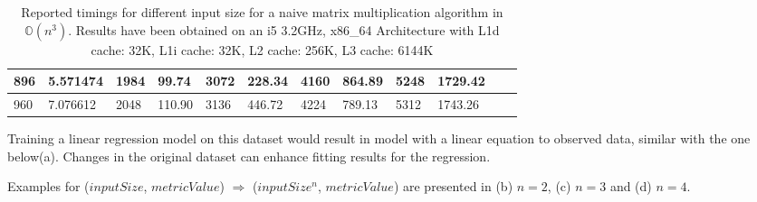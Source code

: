 \begin{table}[H]
\begin{center}
{\begin{tabular}{|l|l|l|l|l|l|l|l|l|l|l|l|}
896                                                  & 5.571474 & 1984                                                 & 99.74  & 3072                                                 & 228.34 & 4160                                                 & 864.89 & 5248                                                 & 1729.42 &                                                      &         \\ \hline
960                                                  & 7.076612 & 2048                                                 & 110.90 & 3136                                                 & 446.72 & 4224                                                 & 789.13 & 5312                                                 & 1743.26 &                                                      &         \\ \hline
\end{tabular}
}
\end{center}
\caption{Reported timings for different input size for a naive matrix multiplication algorithm in $\mathbb{O}(n^{3})$. Results have been obtained on an i5 3.2GHz, x86\_64 Architecture with L1d cache: 32K, L1i cache: 32K, L2 cache: 256K, L3 cache:  6144K}
\end{table}

Training a linear regression model on this dataset would result in model with a linear equation to observed data, similar with the one below(a). Changes in the original dataset can enhance fitting results for the regression. 

Examples for ($inputSize$, $metricValue$) $ \Rightarrow $ ($inputSize^{n}$, $metricValue$) are presented in (b) $n = 2$, (c) $n = 3$ and (d) $n = 4$.


